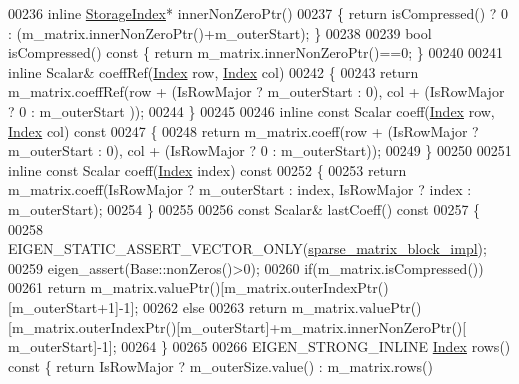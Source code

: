 \begin{DoxyCode}
00236     \textcolor{keyword}{inline} \hyperlink{group___sparse_core___module_a0b540ba724726ebe953f8c0df06081ed}{StorageIndex}* innerNonZeroPtr()
00237     \{ \textcolor{keywordflow}{return} isCompressed() ? 0 : (m\_matrix.innerNonZeroPtr()+m\_outerStart); \}
00238 
00239     \textcolor{keywordtype}{bool} isCompressed()\textcolor{keyword}{ const }\{ \textcolor{keywordflow}{return} m\_matrix.innerNonZeroPtr()==0; \}
00240 
00241     \textcolor{keyword}{inline} Scalar& coeffRef(\hyperlink{group___core___module_a554f30542cc2316add4b1ea0a492ff02}{Index} row, \hyperlink{group___core___module_a554f30542cc2316add4b1ea0a492ff02}{Index} col)
00242     \{
00243       \textcolor{keywordflow}{return} m\_matrix.coeffRef(row + (IsRowMajor ? m\_outerStart : 0), col + (IsRowMajor ? 0 :  m\_outerStart
      ));
00244     \}
00245 
00246     \textcolor{keyword}{inline} \textcolor{keyword}{const} Scalar coeff(\hyperlink{group___core___module_a554f30542cc2316add4b1ea0a492ff02}{Index} row, \hyperlink{group___core___module_a554f30542cc2316add4b1ea0a492ff02}{Index} col)\textcolor{keyword}{ const}
00247 \textcolor{keyword}{    }\{
00248       \textcolor{keywordflow}{return} m\_matrix.coeff(row + (IsRowMajor ? m\_outerStart : 0), col + (IsRowMajor ? 0 :  m\_outerStart));
00249     \}
00250 
00251     \textcolor{keyword}{inline} \textcolor{keyword}{const} Scalar coeff(\hyperlink{group___core___module_a554f30542cc2316add4b1ea0a492ff02}{Index} index)\textcolor{keyword}{ const}
00252 \textcolor{keyword}{    }\{
00253       \textcolor{keywordflow}{return} m\_matrix.coeff(IsRowMajor ? m\_outerStart : index, IsRowMajor ? index :  m\_outerStart);
00254     \}
00255 
00256     \textcolor{keyword}{const} Scalar& lastCoeff()\textcolor{keyword}{ const}
00257 \textcolor{keyword}{    }\{
00258       EIGEN\_STATIC\_ASSERT\_VECTOR\_ONLY(\hyperlink{class_eigen_1_1internal_1_1sparse__matrix__block__impl}{sparse\_matrix\_block\_impl});
00259       eigen\_assert(Base::nonZeros()>0);
00260       \textcolor{keywordflow}{if}(m\_matrix.isCompressed())
00261         \textcolor{keywordflow}{return} m\_matrix.valuePtr()[m\_matrix.outerIndexPtr()[m\_outerStart+1]-1];
00262       \textcolor{keywordflow}{else}
00263         \textcolor{keywordflow}{return} m\_matrix.valuePtr()[m\_matrix.outerIndexPtr()[m\_outerStart]+m\_matrix.innerNonZeroPtr()[
      m\_outerStart]-1];
00264     \}
00265 
00266     EIGEN\_STRONG\_INLINE \hyperlink{group___core___module_a554f30542cc2316add4b1ea0a492ff02}{Index} rows()\textcolor{keyword}{ const }\{ \textcolor{keywordflow}{return} IsRowMajor ? m\_outerSize.value() : m\_matrix.rows()

\end{DoxyCode}
